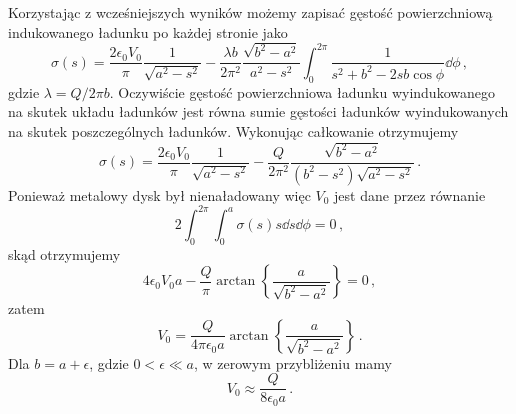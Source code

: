 \documentclass[../main.tex]{subfiles}
\begin{document}
\begin{enumerate}
    Korzystając z wcześniejszych wyników możemy zapisać gęstość powierzchniową indukowanego ładunku
    po każdej stronie jako
    \begin{equation*}
        \sigma(s)=\frac{2\epsilon_0V_0}{\pi}\frac{1}{\sqrt{a^2-s^2}}-\frac{\lambda b}{2\pi^2}\frac{\sqrt{b^2-a^2}}{a^2-s^2}\int_0^{2\pi}\frac{1}{s^2+b^2-2sb\cos\phi}\dd{\phi}\,,
    \end{equation*}
    gdzie \(\lambda=Q/2\pi b\). Oczywiście gęstość powierzchniowa ładunku wyindukowanego na skutek
    układu ładunków jest równa sumie gęstości ładunków wyindukowanych na skutek poszczególnych
    ładunków. Wykonując całkowanie otrzymujemy
    \begin{equation*}
        \sigma(s)=\frac{2\epsilon_0V_0}{\pi}\frac{1}{\sqrt{a^2-s^2}}-\frac{Q}{2\pi^2}\frac{\sqrt{b^2-a^2}}{(b^2-s^2)\sqrt{a^2-s^2}}\,.
    \end{equation*}
    Ponieważ metalowy dysk był nienaładowany więc \(V_0\) jest dane przez równanie
    \begin{equation*}
        2\int_0^{2\pi}\int_0^a\sigma(s)s\dd{s}\dd{\phi}=0\,,
    \end{equation*}
    skąd otrzymujemy
    \begin{equation*}
        4\epsilon_0V_0a-\frac{Q}{\pi}\arctan\left\{\frac{a}{\sqrt{b^2-a^2}}\right\}=0\,,
    \end{equation*}
    zatem
    \begin{equation*}
        V_0=\frac{Q}{4\pi\epsilon_0a}\arctan\left\{\frac{a}{\sqrt{b^2-a^2}}\right\}\,.
    \end{equation*}
    Dla \(b=a+\epsilon\), gdzie \(0<\epsilon\ll a\), w zerowym przybliżeniu mamy
    \begin{equation*}
        V_0\approx \frac{Q}{8\epsilon_0a}\,.
    \end{equation*}
\end{enumerate}
\end{document}
